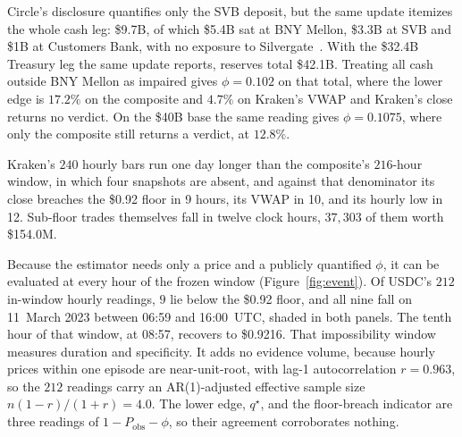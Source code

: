 Circle's disclosure quantifies only the SVB deposit, but the same update itemizes the
whole cash leg: \$9.7B, of which \$5.4B sat at BNY Mellon, \$3.3B at SVB and \$1B at
Customers Bank, with no exposure to Silvergate~\cite{circle2023update}. With the \$32.4B
Treasury leg the same update reports, reserves total \$42.1B. Treating all cash outside
BNY Mellon as impaired gives $\phi=0.102$ on that total, where the
lower edge is $17.2\%$ on the composite and $4.7\%$ on Kraken's VWAP and Kraken's close
returns no verdict. On the \$40B base the same reading gives $\phi=0.1075$, where only
the composite still returns a verdict, at $12.8\%$.

Kraken's $240$ hourly bars run one day longer than the composite's $216$-hour window,
in which four snapshots are absent, and against that denominator its close breaches the
\$0.92 floor in 9 hours, its VWAP in 10, and its hourly low in 12. Sub-floor trades
themselves fall in twelve clock hours, $37{,}303$ of them worth \$154.0M.

Because the estimator needs only a price and a publicly quantified $\phi$, it can be
evaluated at every hour of the frozen window (Figure~\ref{fig:event}). Of USDC's $212$
in-window hourly readings, $9$ lie below the \$0.92 floor, and all nine fall on 11~March
2023 between 06{:}59 and 16{:}00~UTC, shaded in both panels. The
tenth hour of that window, at 08{:}57, recovers to \$0.9216. That impossibility window measures duration and
specificity. It adds no evidence volume, because hourly prices within one episode are
near-unit-root, with lag-1 autocorrelation $r=0.963$, so the $212$ readings carry an
AR(1)-adjusted effective sample size $n(1-r)/(1+r)=4.0$. The lower edge, $q^{\star}$, and the
floor-breach indicator are three readings of $1-P_{\mathrm{obs}}-\phi$, so their agreement
corroborates nothing.
